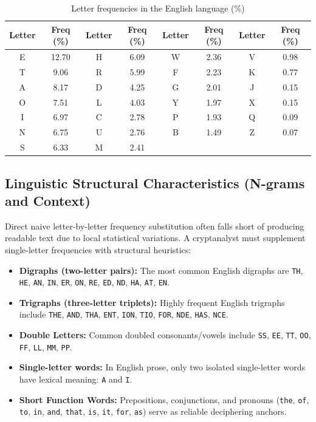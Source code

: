 \documentclass[12pt,a4paper]{article}
\begin{document}
\begin{table}[H]
\centering
\caption{Letter frequencies in the English language (\%)}
\label{tab:english_freq}
\small
\begin{tabular}{cc|cc|cc|cc}
\toprule
\textbf{Letter} & \textbf{Freq (\%)} & \textbf{Letter} & \textbf{Freq (\%)} & \textbf{Letter} & \textbf{Freq (\%)} & \textbf{Letter} & \textbf{Freq (\%)} \\
\midrule
E & 12.70 & H & 6.09 & W & 2.36 & V & 0.98 \\
T & 9.06  & R & 5.99 & F & 2.23 & K & 0.77 \\
A & 8.17  & D & 4.25 & G & 2.01 & J & 0.15 \\
O & 7.51  & L & 4.03 & Y & 1.97 & X & 0.15 \\
I & 6.97  & C & 2.78 & P & 1.93 & Q & 0.09 \\
N & 6.75  & U & 2.76 & B & 1.49 & Z & 0.07 \\
S & 6.33  & M & 2.41 &   &      &   &      \\
\bottomrule
\end{tabular}
\end{table}

\subsection{Linguistic Structural Characteristics (N-grams and Context)}
Direct naive letter-by-letter frequency substitution often falls short of producing readable text due to local statistical variations. A cryptanalyst must supplement single-letter frequencies with structural heuristics:
\begin{itemize}
    \item \textbf{Digraphs (two-letter pairs):} The most common English digraphs are \texttt{TH}, \texttt{HE}, \texttt{AN}, \texttt{IN}, \texttt{ER}, \texttt{ON}, \texttt{RE}, \texttt{ED}, \texttt{ND}, \texttt{HA}, \texttt{AT}, \texttt{EN}.
    \item \textbf{Trigraphs (three-letter triplets):} Highly frequent English trigraphs include \texttt{THE}, \texttt{AND}, \texttt{THA}, \texttt{ENT}, \texttt{ION}, \texttt{TIO}, \texttt{FOR}, \texttt{NDE}, \texttt{HAS}, \texttt{NCE}.
    \item \textbf{Double Letters:} Common doubled consonants/vowels include \texttt{SS}, \texttt{EE}, \texttt{TT}, \texttt{OO}, \texttt{FF}, \texttt{LL}, \texttt{MM}, \texttt{PP}.
    \item \textbf{Single-letter words:} In English prose, only two isolated single-letter words have lexical meaning: \texttt{A} and \texttt{I}.
    \item \textbf{Short Function Words:} Prepositions, conjunctions, and pronouns (\texttt{the}, \texttt{of}, \texttt{to}, \texttt{in}, \texttt{and}, \texttt{that}, \texttt{is}, \texttt{it}, \texttt{for}, \texttt{as}) serve as reliable deciphering anchors.
\end{itemize}
\end{document}
